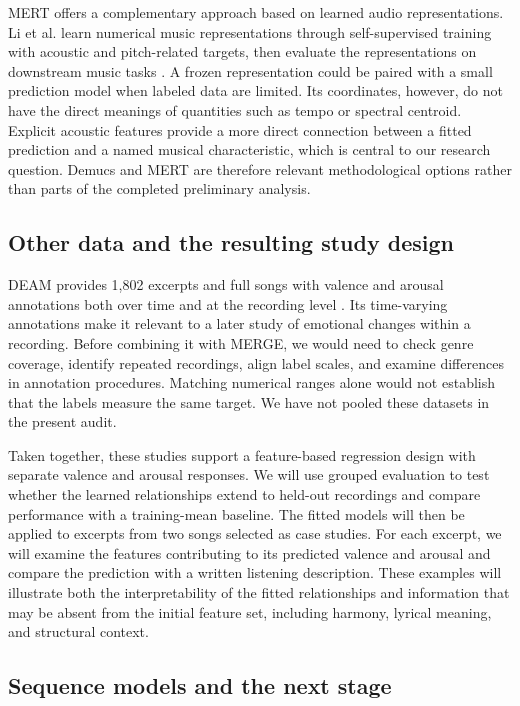 MERT offers a complementary approach based on learned audio representations. Li et al. learn numerical music representations through self-supervised training with acoustic and pitch-related targets, then evaluate the representations on downstream music tasks \cite{li2024mert}. A frozen representation could be paired with a small prediction model when labeled data are limited. Its coordinates, however, do not have the direct meanings of quantities such as tempo or spectral centroid. Explicit acoustic features provide a more direct connection between a fitted prediction and a named musical characteristic, which is central to our research question. Demucs and MERT are therefore relevant methodological options rather than parts of the completed preliminary analysis.

\subsection{Other data and the resulting study design}

DEAM provides 1,802 excerpts and full songs with valence and arousal annotations both over time and at the recording level \cite{deamdataset}. Its time-varying annotations make it relevant to a later study of emotional changes within a recording. Before combining it with MERGE, we would need to check genre coverage, identify repeated recordings, align label scales, and examine differences in annotation procedures. Matching numerical ranges alone would not establish that the labels measure the same target. We have not pooled these datasets in the present audit.

Taken together, these studies support a feature-based regression design with separate valence and arousal responses. We will use grouped evaluation to test whether the learned relationships extend to held-out recordings and compare performance with a training-mean baseline. The fitted models will then be applied to excerpts from two songs selected as case studies. For each excerpt, we will examine the features contributing to its predicted valence and arousal and compare the prediction with a written listening description. These examples will illustrate both the interpretability of the fitted relationships and information that may be absent from the initial feature set, including harmony, lyrical meaning, and structural context.

\subsection{Sequence models and the next stage}

